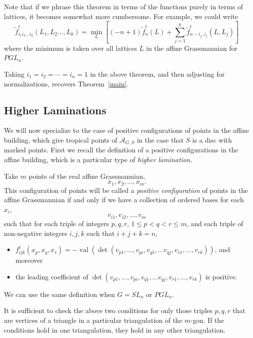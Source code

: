 \documentclass[ALCO,ThmDefs,Unicode,epreuves]{cedram}
\newcommand{\A}{\mathcal{A}}
\newcommand{\val}{\operatorname{val}}
\begin{document}
\begin{rema} Note that if we phrase this theorem in terms of the functions purely in terms of lattices, it becomes somewhat more cumbersome. For example, we could write
\[
\tilde{f}^t_{i_1i_2\dots i_k}(L_1,L_2\dots,L_k) = \min_{L} \left[(-n+1)\tilde{f}_n^t(L) + \sum_{j=1}^k \tilde{f}^t_{n-i_j, i_j}(L,L_j) \right]
\]
where the minimum is taken over all lattices $L$ in the affine Grassmannian for $PGL_n$.
\end{rema}

\begin{rema} Taking $i_1=i_2=\cdots=i_n=1$ in the above theorem, and then adjusting for normalizations, recovers Theorem~\ref{main}.
\end{rema}

\subsection{Higher Laminations}

We will now specialize to the case of positive configurations of points in the affine building, which give tropical points of $\A_{G,S}$ in the case that $S$ is a disc with marked points. First we recall the definition of a positive configurations in the affine building, which is a particular type of \emph{higher lamination}.

\begin{definition} Take $m$ points of the real affine Grassmannian, 
\[
x_1, x_2, \dots, x_m.
\]
This configuration of points will be called a \emph{positive configuration} of points in the affine Grassmannian if and only if we have a collection of ordered bases for each $x_i$,
\[
v_{i1}, v_{i2}, \dots, v_{in}
\]
such that for each triple of integers $p, q, r$, $1 \leq p < q < r \leq m$, and each triple of non-negative integers $i, j, k$ such that $i+j+k=n$,
\begin{itemize}
\item $f_{ijk}^t (x_p,x_q,x_r) = -\val(\det(v_{p1}, \dots, v_{pi}, v_{q1}, \dots v_{qj}, v_{r1}, \dots, v_{rk}))$, and moreover
\item the leading coefficient of $\det(v_{p1}, \dots, v_{pi}, v_{q1}, \dots v_{qj}, v_{r1}, \dots, v_{rk})$ is positive.
\end{itemize}
\end{definition}

We can use the same definition when $G=SL_n$ or $PGL_n$.

\begin{rema} It is sufficient to check the above two conditions for only those triples $p, q, r$ that are vertices of a triangle in a particular triangulation of the $m$-gon. If the conditions hold in one triangulation, they hold in any other triangulation.
\end{rema}
\end{document}
